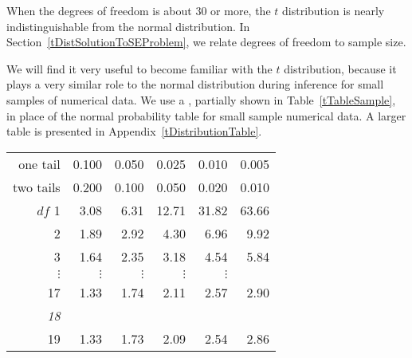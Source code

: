 When the degrees of freedom is about 30 or more, the $t$ distribution is nearly indistinguishable from the normal distribution. In Section~\ref{tDistSolutionToSEProblem}, we relate degrees of freedom to sample size.

We will find it very useful to become familiar with the $t$ distribution, because it plays a very similar role to the normal distribution during inference for small samples of numerical data. %
We use a , partially shown in Table~\ref{tTableSample}, in place of the normal probability table for small sample numerical data. %
A larger table is presented in Appendix~\vref{tDistributionTable}.

\begin{table}[hht]
\centering
\begin{tabular}{r | rrr rr}
one tail & \hspace{1.5mm}  0.100 & \hspace{1.5mm} 0.050 & \hspace{1.5mm} 0.025 & \hspace{1.5mm} 0.010 & \hspace{1.5mm} 0.005  \\
two tails & 0.200 & 0.100 & 0.050 & 0.020 & 0.010 \\
\hline
{$df$} \hfill 1  &  {\normalsize  3.08} & {\normalsize  6.31} & {\normalsize 12.71} & {\normalsize 31.82} & {\normalsize 63.66}  \\ 
2  &  {\normalsize  1.89} & {\normalsize  2.92} & {\normalsize  4.30} & {\normalsize  6.96} & {\normalsize  9.92}  \\ 
3  &  {\normalsize  1.64} & {\normalsize  2.35} & {\normalsize  3.18} & {\normalsize  4.54} & {\normalsize  5.84}  \\ 
$\vdots$ & $\vdots$ &$\vdots$ &$\vdots$ &$\vdots$ & \\
17  &  {\normalsize  1.33} & {\normalsize  1.74} & {\normalsize  2.11} & {\normalsize  2.57} & {\normalsize  2.90}  \\ 
\em\color{tableHLBlue}18  &  \em\color{tableHLBlue}{\normalsize  1.33} & \em\color{tableHLBlue}{\normalsize  1.73} & \em\color{tableHLBlue}{\normalsize  2.10} & \em\color{tableHLBlue}{\normalsize  2.55} & \em\color{tableHLBlue}{\normalsize  2.88}  \\ 
19  &  {\normalsize  1.33} & {\normalsize  1.73} & {\normalsize  2.09} & {\normalsize  2.54} & {\normalsize  2.86}  \\ 

\end{tabular}
\end{table}
